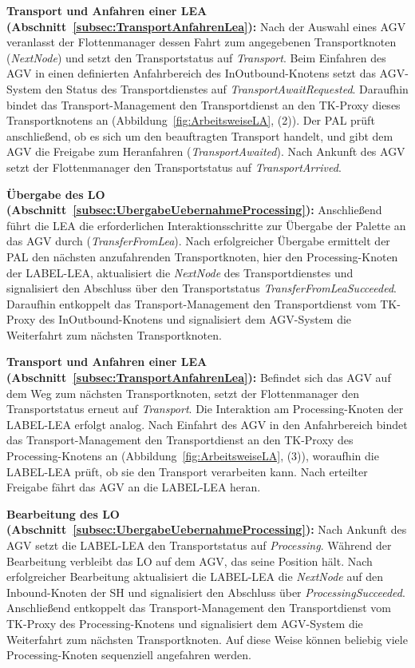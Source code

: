 \textbf{Transport und Anfahren einer LEA (Abschnitt~\ref{subsec:TransportAnfahrenLea}):} Nach der Auswahl eines AGV veranlasst der Flottenmanager dessen Fahrt zum angegebenen Transportknoten (\emph{NextNode}) und setzt den Transportstatus auf \emph{Transport}. Beim Einfahren des AGV in einen definierten Anfahrbereich des InOutbound-Knotens setzt das AGV-System den Status des Transportdienstes auf \emph{TransportAwaitRequested}. Daraufhin bindet das Transport-Management den Transportdienst an den TK-Proxy dieses Transportknotens an (Abbildung~\ref{fig:ArbeitsweiseLA}, (2)).
Der PAL prüft anschließend, ob es sich um den beauftragten Transport handelt, und gibt dem AGV die Freigabe zum Heranfahren (\emph{TransportAwaited}). Nach Ankunft des AGV setzt der Flottenmanager den Transportstatus auf \emph{TransportArrived}.

\textbf{Übergabe des LO (Abschnitt~\ref{subsec:UbergabeUebernahmeProcessing}):} Anschließend führt die LEA die erforderlichen Interaktionsschritte zur Übergabe der Palette an das AGV durch (\emph{TransferFromLea}). Nach erfolgreicher Übergabe ermittelt der PAL den nächsten anzufahrenden Transportknoten, hier den Processing-Knoten der LABEL-LEA, aktualisiert die \emph{NextNode} des Transportdienstes und signalisiert den Abschluss über den Transportstatus \emph{TransferFromLeaSucceeded}. Daraufhin entkoppelt das Transport-Management den Transportdienst vom TK-Proxy des InOutbound-Knotens und signalisiert dem AGV-System die Weiterfahrt zum nächsten Transportknoten.

\textbf{Transport und Anfahren einer LEA (Abschnitt~\ref{subsec:TransportAnfahrenLea}):} Befindet sich das AGV auf dem Weg zum nächsten Transportknoten, setzt der Flottenmanager den Transportstatus erneut auf \emph{Transport}. Die Interaktion am Processing-Knoten der LABEL-LEA erfolgt analog. Nach Einfahrt des AGV in den Anfahrbereich bindet das Transport-Management den Transportdienst an den TK-Proxy des Processing-Knotens an (Abbildung~\ref{fig:ArbeitsweiseLA}, (3)), woraufhin die LABEL-LEA prüft, ob sie den Transport verarbeiten kann. Nach erteilter Freigabe fährt das AGV an die LABEL-LEA heran.

\textbf{Bearbeitung des LO (Abschnitt~\ref{subsec:UbergabeUebernahmeProcessing}):} Nach Ankunft des AGV setzt die LABEL-LEA den Transportstatus auf \emph{Processing}. Während der Bearbeitung verbleibt das LO auf dem AGV, das seine Position hält. Nach erfolgreicher Bearbeitung aktualisiert die LABEL-LEA die \emph{NextNode} auf den Inbound-Knoten der SH und signalisiert den Abschluss über \emph{ProcessingSucceeded}. Anschließend entkoppelt das Transport-Management den Transportdienst vom TK-Proxy des Processing-Knotens und signalisiert dem AGV-System die Weiterfahrt zum nächsten Transportknoten. Auf diese Weise können beliebig viele Processing-Knoten sequenziell angefahren werden.

